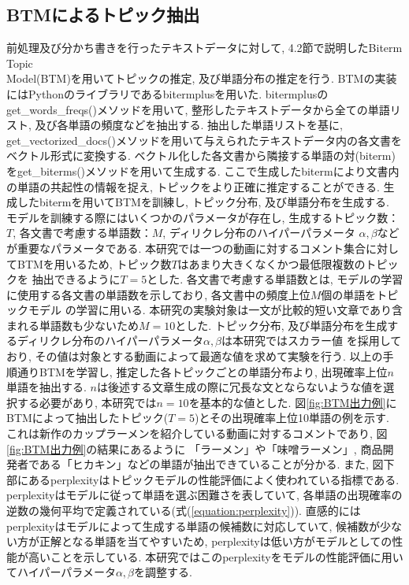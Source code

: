 \documentclass{ltjarticle}
\begin{document}
\subsection{BTMによるトピック抽出}
前処理及び分かち書きを行ったテキストデータに対して, 4.2節で説明したBiterm Topic \\
Model(BTM)を用いてトピックの推定, 及び単語分布の推定を行う. 
BTMの実装にはPythonのライブラリであるbitermplusを用いた. 
bitermplusのget\_words\_freqs()メソッドを用いて, 
整形したテキストデータから全ての単語リスト, 及び各単語の頻度などを抽出する. 
抽出した単語リストを基に, get\_vectorized\_docs()メソッドを用いて与えられたテキストデータ内の各文書をベクトル形式に変換する. 
ベクトル化した各文書から隣接する単語の対(biterm)をget\_biterms()メソッドを用いて生成する. 
ここで生成したbitermにより文書内の単語の共起性の情報を捉え, トピックをより正確に推定することができる. 
生成したbitermを用いてBTMを訓練し, トピック分布, 及び単語分布を生成する. 
モデルを訓練する際にはいくつかのパラメータが存在し, 生成するトピック数：$T$, 各文書で考慮する単語数：$M$, ディリクレ分布のハイパーパラメータ
$\alpha, \beta$などが重要なパラメータである. 
本研究では一つの動画に対するコメント集合に対してBTMを用いるため, トピック数$T$はあまり大きくなくかつ最低限複数のトピックを
抽出できるように$T=5$とした. 
各文書で考慮する単語数とは, モデルの学習に使用する各文書の単語数を示しており, 各文書中の頻度上位$M$個の単語をトピックモデル
の学習に用いる. 本研究の実験対象は一文が比較的短い文章であり含まれる単語数も少ないため$M=10$とした. 
トピック分布, 及び単語分布を生成するディリクレ分布のハイパーパラメータ$\alpha, \beta$は本研究ではスカラー値
を採用しており, その値は対象とする動画によって最適な値を求めて実験を行う. 
以上の手順通りBTMを学習し, 推定した各トピックごとの単語分布より, 出現確率上位$n$単語を抽出する. 
$n$は後述する文章生成の際に冗長な文とならないような値を選択する必要があり, 本研究では$n=10$を基本的な値とした. 
図\ref{fig:BTM出力例}にBTMによって抽出したトピック($T=5$)とその出現確率上位10単語の例を示す. 
これは新作のカップラーメンを紹介している動画に対するコメントであり, 図\ref{fig:BTM出力例}の結果にあるように
「ラーメン」や「味噌ラーメン」, 商品開発者である「ヒカキン」などの単語が抽出できていることが分かる. 
また, 図下部にあるperplexityはトピックモデルの性能評価によく使われている指標である. 
perplexityはモデルに従って単語を選ぶ困難さを表していて, 
各単語の出現確率の逆数の幾何平均で定義されている(式(\ref{equation:perplexity})).
直感的にはperplexityはモデルによって生成する単語の候補数に対応していて, 候補数が少ない方が正解となる単語を当てやすいため,  
perplexityは低い方がモデルとしての性能が高いことを示している. 
本研究ではこのperplexityをモデルの性能評価に用いてハイパーパラメータ$\alpha, \beta$を調整する. \\
\vspace{5truept}
\end{document}
